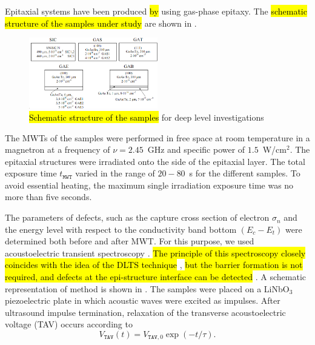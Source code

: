 \documentclass[10pt]{iopart}
\begin{document}
Epitaxial systems have been produced \hl{by} using gas-phase epitaxy.
The \hl{schematic structure of the samples under study} are shown in .

\begin{figure}
\includegraphics[width=0.5\textwidth]{Fig1}
\caption{\label{figSamp_TAV}
\hl{Schematic structure of the samples} for deep level investigations
}%
\end{figure}

The MWTs of the samples were performed in free space at room temperature in a magnetron at a frequency of  $\nu=2.45$~GHz
and specific power of $1.5$~W/cm$^{2}$.
The epitaxial structures were irradiated onto the side of the epitaxial layer.
The total exposure time $t_\mathtt{MWT}$ varied in the range of $20-80$~s for the different samples.
To avoid essential heating, the maximum single irradiation exposure time was no more than  five seconds.

The parameters of defects, such as the capture cross section of electron $\sigma_n$
and the energy level with respect to the conductivity band bottom $(E_c-E_t)$ were determined both before and after MWT.
For this purpose, we used acoustoelectric transient spectroscopy \cite{OstrovPAN,OlikhSSC,OstrovskiiSST,PANnewEn}.
\hl{The  principle of this spectroscopy closely coincides with the idea  of  the DLTS
technique} \cite{TAV:1993MIS},
\hl{but the  barrier formation is not required,
and defects at the epi-structure interface can be detected} \cite{OstrovPAN,OlikhSSC,OstrovskiiSST}.
A schematic representation of method is shown in .
The samples were placed on a LiNbO$_3$ piezoelectric plate in which acoustic waves were excited as impulses.
After ultrasound impulse termination, relaxation of the transverse  acoustoelectric voltage (TAV) occurs according to
\begin{equation}\label{eqVtav}
  V_\mathtt{TAV}(t)=V_{\mathtt{TAV},0}\exp(-t/\tau).
\end{equation}
\end{document}
